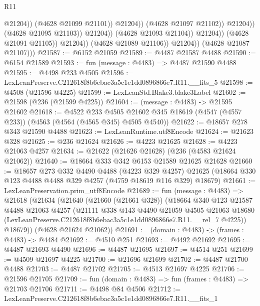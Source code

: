 \begin{lexlean}{R11}
\begin{coremodule}
                                                @21204))
                                            (@4628 @21099 @21101))
                                          @21204))
                                      (@4628 @21097 @21102))
                                    @21204))
                                (@4628 @21095 @21103))
                              @21204))
                          (@4628 @21093 @21104))
                        @21204))
                    (@4628 @21091 @21105))
                  @21204))
              (@4628 @21089 @21106))
            @21204))
        (@4628 @21087 @21107)))
@21587 := @6152 @21059
@21589 := @4487 @21587 @4488
@21590 := @6154 @21589
@21593 := fun (message : @4483) => @4487 @21590 @4488
@21595 := @4498 @233 @4505
@21596 := LexLeanPreserve.C212618f8b6ebac3a5c1e1dd0896866e7.R11.__fits_5
@21598 := @4508 (@21596 @4225)
@21599 := LexLeanStd.Blake3.blake3Label
@21602 := @21598 (@236 (@21599 @4225))
@21604 := (message : @4483) -> @21595 @21602
@21618 := @4522
    @233
    @4505
    @21602
    @345
    @18619
    (@4547 (@4557 @233))
    (@4563 (@4564 (@4565 @345) @4505 @4540))
@21622 := @18657 @278 @343 @21590 @4488
@21623 := LexLeanRuntime.utf8Encode
@21624 := @21623 @328
@21625 := @236 @21624
@21626 := @4223 @21625
@21628 := @4223 @21063 @4257
@21634 := @21622 (@21626 @21628) (@236 (@4583 @21624 @21062))
@21640 := @18664 @333 @342 @6153 @21589 @21625 @21628
@21660 := @18657
    @273
    @332
    @4490
    @4488
    (@4223 @329 @4257)
    @21625
    (@18664 @330 @123 @4488 @4488 @329 @4257 (@4759 @18619 @116 @329) @18679)
@21661 := LexLeanPreservation.prim_utf8Encode
@21689 := fun (message : @4483) =>
  @21618
    (@21634
      (@21640
        (@21660 (@21661 @328))
        (@18664
          @340
          @123
          @21587
          @4488
          @21063
          @4257
          (@21111
            @338
            @143
            @4490
            @21059
            @4505
            @21063
            @18680
            (LexLeanPreserve.C212618f8b6ebac3a5c1e1dd0896866e7.R11.__rel_7 @4225))
          @18679))
      (@4628 @21624 @21062))
@21691 := (domain : @4483) -> (frames : @4483) -> @4484
@21692 := @4510 @251
@21693 := @4492 @21692
@21695 := @4487 @21693 @4490
@21696 := @4487 @21695
@21697 := @4514 @251
@21699 := @4509 @21697 @4225
@21700 := @21696 @21699
@21702 := @4487 @21700 @4488
@21703 := @4487 @21702
@21705 := @4513 @21697 @4225
@21706 := @21596 @21705
@21709 := fun (domain : @4483) => fun (frames : @4483) => @21703 @21706
@21711 := @4498 @84 @4506
@21712 := LexLeanPreserve.C212618f8b6ebac3a5c1e1dd0896866e7.R11.__fits_1

\end{coremodule}
\end{lexlean}
